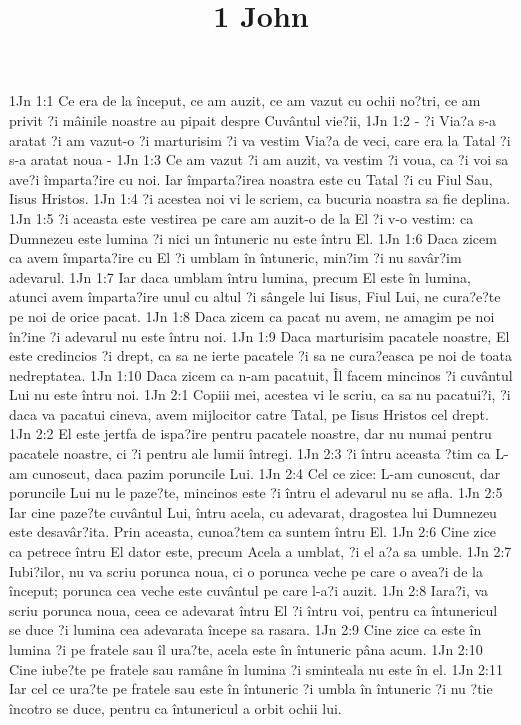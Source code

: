 

\title{1 John}

1Jn 1:1  Ce era de la început, ce am auzit, ce am vazut cu ochii no?tri, ce am privit ?i mâinile noastre au pipait despre Cuvântul vie?ii,
1Jn 1:2  - ?i Via?a s-a aratat ?i am vazut-o ?i marturisim ?i va vestim Via?a de veci, care era la Tatal ?i s-a aratat noua -
1Jn 1:3  Ce am vazut ?i am auzit, va vestim ?i voua, ca ?i voi sa ave?i împarta?ire cu noi. Iar împarta?irea noastra este cu Tatal ?i cu Fiul Sau, Iisus Hristos.
1Jn 1:4  ?i acestea noi vi le scriem, ca bucuria noastra sa fie deplina.
1Jn 1:5  ?i aceasta este vestirea pe care am auzit-o de la El ?i v-o vestim: ca Dumnezeu este lumina ?i nici un întuneric nu este întru El.
1Jn 1:6  Daca zicem ca avem împarta?ire cu El ?i umblam în întuneric, min?im ?i nu savâr?im adevarul.
1Jn 1:7  Iar daca umblam întru lumina, precum El este în lumina, atunci avem împarta?ire unul cu altul ?i sângele lui Iisus, Fiul Lui, ne cura?e?te pe noi de orice pacat.
1Jn 1:8  Daca zicem ca pacat nu avem, ne amagim pe noi în?ine ?i adevarul nu este întru noi.
1Jn 1:9  Daca marturisim pacatele noastre, El este credincios ?i drept, ca sa ne ierte pacatele ?i sa ne cura?easca pe noi de toata nedreptatea.
1Jn 1:10  Daca zicem ca n-am pacatuit, Îl facem mincinos ?i cuvântul Lui nu este întru noi.
1Jn 2:1  Copiii mei, acestea vi le scriu, ca sa nu pacatui?i, ?i daca va pacatui cineva, avem mijlocitor catre Tatal, pe Iisus Hristos cel drept.
1Jn 2:2  El este jertfa de ispa?ire pentru pacatele noastre, dar nu numai pentru pacatele noastre, ci ?i pentru ale lumii întregi.
1Jn 2:3  ?i întru aceasta ?tim ca L-am cunoscut, daca pazim poruncile Lui.
1Jn 2:4  Cel ce zice: L-am cunoscut, dar poruncile Lui nu le paze?te, mincinos este ?i întru el adevarul nu se afla.
1Jn 2:5  Iar cine paze?te cuvântul Lui, întru acela, cu adevarat, dragostea lui Dumnezeu este desavâr?ita. Prin aceasta, cunoa?tem ca suntem întru El.
1Jn 2:6  Cine zice ca petrece întru El dator este, precum Acela a umblat, ?i el a?a sa umble.
1Jn 2:7  Iubi?ilor, nu va scriu porunca noua, ci o porunca veche pe care o avea?i de la început; porunca cea veche este cuvântul pe care l-a?i auzit.
1Jn 2:8  Iara?i, va scriu porunca noua, ceea ce adevarat întru El ?i întru voi, pentru ca întunericul se duce ?i lumina cea adevarata începe sa rasara.
1Jn 2:9  Cine zice ca este în lumina ?i pe fratele sau îl ura?te, acela este în întuneric pâna acum.
1Jn 2:10  Cine iube?te pe fratele sau ramâne în lumina ?i sminteala nu este în el.
1Jn 2:11  Iar cel ce ura?te pe fratele sau este în întuneric ?i umbla în întuneric ?i nu ?tie încotro se duce, pentru ca întunericul a orbit ochii lui.
